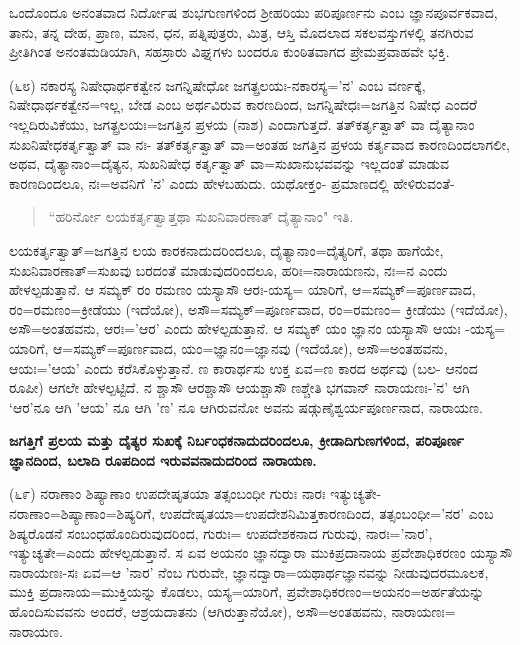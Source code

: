 ಒಂದೊಂದೂ ಅನಂತವಾದ ನಿರ್ದೋಷ ಶುಭಗುಣಗಳಿಂದ ಶ‍್ರೀಹರಿಯು ಪರಿಪೂರ್ಣನು ಎಂಬ ಜ್ಞಾನಪೂರ್ವಕವಾದ, ತಾನು, ತನ್ನ ದೇಹ, ಪ್ರಾಣ, ಮಾನ, ಧನ, ಪತ್ನಿಪುತ್ರರು, ಮಿತ್ರ, ಆಸ್ತಿ ಮೊದಲಾದ ಸಕಲವಸ್ತುಗಳಲ್ಲಿ ತನಗಿರುವ ಪ್ರೀತಿಗಿಂತ ಅನಂತಮಡಿಯಾಗಿ, ಸಹಸ್ರಾರು ವಿಘ್ನಗಳು ಬಂದರೂ ಕುಂಠಿತವಾಗದ ಪ್ರೇಮಪ್ರವಾಹವೇ ಭಕ್ತಿ.

(೬೮) ನಕಾರಸ್ಯ ನಿಷೇಧಾರ್ಥಕತ್ವೇನ ಜಗನ್ನಿಷೇಧೋ ಜಗತ್ಪ್ರಲಯಃ-ನಕಾರಸ್ಯ='ನ' ಎಂಬ ವರ್ಣಕ್ಕೆ, ನಿಷೇಧಾರ್ಥಕತ್ವೇನ=ಇಲ್ಲ, ಬೇಡ ಎಂಬ ಅರ್ಥವಿರುವ ಕಾರಣದಿಂದ, ಜಗನ್ನಿಷೇಧಃ=ಜಗತ್ತಿನ ನಿಷೇಧ ಎಂದರೆ ಇಲ್ಲದಿರುವಿಕೆಯು, ಜಗತ್ಪ್ರಲಯಃ=ಜಗತ್ತಿನ ಪ್ರಳಯ (ನಾಶ) ಎಂದಾಗುತ್ತದೆ. ತತ್‌ಕರ್ತೃತ್ವಾತ್ ವಾ ದೈತ್ಯಾನಾಂ ಸುಖನಿಷೇಧಕರ್ತೃತ್ವಾತ್ ವಾ ನಃ- ತತ್‌ಕರ್ತೃತ್ವಾತ್ ವಾ=ಅಂತಹ ಜಗತ್ತಿನ ಪ್ರಳಯ ಕರ್ತೃವಾದ ಕಾರಣದಿಂದಲಾಗಲೀ, ಅಥವ, ದೈತ್ಯಾನಾಂ=ದೈತ್ಯನ, ಸುಖನಿಷೇಧ ಕರ್ತೃತ್ವಾತ್ ವಾ=ಸುಖಾನುಭವವನ್ನು ಇಲ್ಲದಂತೆ ಮಾಡುವ ಕಾರಣದಿಂದಲೂ, ನಃ=ಅವನಿಗೆ 'ನ' ಎಂದು ಹೇಳಬಹುದು. ಯಥೋಕ್ತಂ- ಪ್ರಮಾಣದಲ್ಲಿ ಹೇಳಿರುವಂತೆ-

\begin{verse}
``ಹರಿರ್ನೋ ಲಯಕರ್ತೃತ್ವಾತ್ತಥಾ ಸುಖನಿವಾರಣಾತ್ ದೈತ್ಯಾನಾಂ" ಇತಿ.
\end{verse}

ಲಯಕರ್ತೃತ್ವಾತ್=ಜಗತ್ತಿನ ಲಯ ಕಾರಕನಾದುದರಿಂದಲೂ, ದೈತ್ಯಾನಾಂ=ದೈತ್ಯರಿಗೆ, ತಥಾ ಹಾಗೆಯೇ, ಸುಖನಿವಾರಣಾತ್=ಸುಖವು ಬರದಂತೆ ಮಾಡುವುದರಿಂದಲೂ, ಹರಿಃ=ನಾರಾಯಣನು, ನಃ=ನ ಎಂದು ಹೇಳಲ್ಪಡುತ್ತಾನೆ. ಆ ಸಮ್ಯಕ್ ರಂ ರಮಣಂ ಯಸ್ಯಾಸೌ ಆರಃ-ಯಸ್ಯ= ಯಾರಿಗೆ, ಆ=ಸಮ್ಯಕ್=ಪೂರ್ಣವಾದ, ರಂ=ರಮಣಂ=ಕ್ರೀಡೆಯು (ಇದೆಯೋ), ಅಸೌ=ಸಮ್ಯಕ್=ಪೂರ್ಣವಾದ, ರಂ=ರಮಣಂ= ಕ್ರೀಡೆಯು (ಇದೆಯೋ), ಅಸೌ=ಅಂತಹವನು, ಆರಃ='ಆರ' ಎಂದು ಹೇಳಲ್ಪಡುತ್ತಾನೆ. ಆ ಸಮ್ಯಕ್ ಯಂ ಜ್ಞಾನಂ ಯಸ್ಯಾಸೌ ಆಯಃ -ಯಸ್ಯ= ಯಾರಿಗೆ, ಆ=ಸಮ್ಯಕ್=ಪೂರ್ಣವಾದ, ಯಂ=ಜ್ಞಾನಂ=ಜ್ಞಾನವು (ಇದೆಯೋ), ಅಸೌ=ಅಂತಹವನು, ಆಯಃ='ಆಯ' ಎಂದು ಕರೆಸಿಕೊಳ್ಳುತ್ತಾನೆ. ಣ ಕಾರಾರ್ಥಸು ಉಕ್ತ ಏವ=ಣ ಕಾರದ ಅರ್ಥವು (ಬಲ- ಆನಂದ ರೂಪೀ) ಆಗಲೇ ಹೇಳಲ್ಪಟ್ಟಿದೆ. ನ ಶ್ಚಾಸೌ ಆರಶ್ಚಾಸೌ‌ ಆಯಶ್ಚಾಸೌ ಣಶ್ಚೇತಿ ಭಗವಾನ್ ನಾರಾಯಣಃ-'ನ' ಆಗಿ `ಆರ'ನೂ ಆಗಿ 'ಆಯ' ನೂ ಆಗಿ 'ಣ' ನೂ ಆಗಿರುವನೋ ಅವನು ಷಡ್ಗುಣೈಶ್ವರ್ಯಪೂರ್ಣನಾದ, ನಾರಾಯಣ.

\begin{center}
\textbf{ಜಗತ್ತಿಗೆ ಪ್ರಲಯ ಮತ್ತು ದೈತ್ಯರ ಸುಖಕ್ಕೆ ನಿರ್ಬಂಧಕನಾದುದರಿಂದಲೂ, ಕ್ರೀಡಾದಿಗುಣಗಳಿಂದ, ಪರಿಪೂರ್ಣ ಜ್ಞಾನದಿಂದ, ಬಲಾದಿ ರೂಪದಿಂದ ಇರುವವನಾದುದರಿಂದ ನಾರಾಯಣ.}
\end{center}

(೬೯) ನರಾಣಾಂ ಶಿಷ್ಯಾಣಾಂ ಉಪದೇಷೃತಯಾ ತತ್ಸಂಬಂಧೀ ಗುರುಃ ನಾರಃ ಇತ್ಯುಚ್ಯತೇ-ನರಾಣಾಂ=ಶಿಷ್ಯಾಣಾಂ=ಶಿಷ್ಯರಿಗೆ, ಉಪದೇಷೃತಯಾ=ಉಪದೇಶನಿಮಿತ್ತಕಾರಣದಿಂದ, ತತ್ಸಂಬಂಧೀ='ನರ' ಎಂಬ ಶಿಷ್ಯರೊಡನೆ ಸಂಬಂಧಹೊಂದಿರುವುದರಿಂದ, ಗುರುಃ= ಉಪದೇಶಕನಾದ ಗುರುವು, ನಾರಃ='ನಾರ', ಇತ್ಯುಚ್ಯತೇ=ಎಂದು ಹೇಳಲ್ಪಡುತ್ತಾನೆ. ಸ ಏವ ಅಯನಂ ಜ್ಞಾನದ್ವಾರಾ ಮುಕಿಪ್ರದಾನಾಯ ಪ್ರವೇಶಾಧಿಕರಣಂ ಯಸ್ಯಾಸೌ ನಾರಾಯಣಃ-ಸಃ ಏವ=ಆ 'ನಾರ' ನೆಂಬ ಗುರುವೇ, ಜ್ಞಾನದ್ವಾರಾ=ಯಥಾರ್ಥಜ್ಞಾನವನ್ನು ನೀಡುವುದರಮೂಲಕ, ಮುಕ್ತಿ ಪ್ರದಾನಾಯ=ಮುಕ್ತಿಯನ್ನು ಕೊಡಲು, ಯಸ್ಯ=ಯಾರಿಗೆ, ಪ್ರವೇಶಾಧಿಕರಣಂ=ಅಯನಂ=ಅರ್ಹತೆಯನ್ನು ಹೊಂದಿಸುವವನು ಅಂದರೆ, ಆಶ್ರಯದಾತನು (ಆಗಿರುತ್ತಾನೆಯೋ), ಅಸೌ=ಅಂತಹವನು, ನಾರಾಯಣಃ= ನಾರಾಯಣ.


